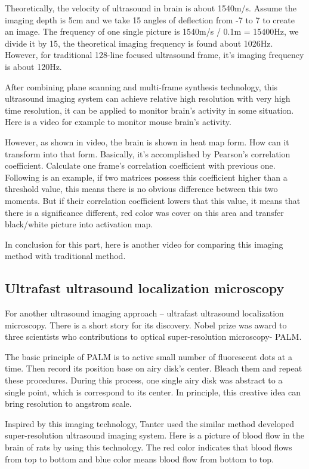\documentclass[paper=a4, fontsize=11pt]{scrartcl} %
\numberwithin{equation}{section} %
\numberwithin{figure}{section} %
\numberwithin{table}{section} %
\begin{document}
Theoretically, the velocity of ultrasound in brain is about 1540m/s. Assume the imaging depth is 5cm and we take 15 angles of deflection from -7 to 7 to create an image. The frequency of one single picture is 1540m/s / 0.1m = 15400Hz, we divide it by 15, the theoretical imaging frequency is found about 1026Hz. However, for traditional 128-line focused ultrasound frame, it’s imaging frequency is about 120Hz.

After combining plane scanning and multi-frame synthesis technology, this ultrasound imaging system can achieve relative high resolution with very high time resolution, it can be applied to monitor brain’s activity in some situation. Here is a video for example to monitor mouse brain’s activity.

However, as shown in video, the brain is shown in heat map form. How can it transform into that form. Basically, it’s accomplished by Pearson’s correlation coefficient. Calculate one frame’s correlation coefficient with previous one. Following is an example, if two matrices possess this coefficient higher than a threshold value, this means there is no obvious difference between this two moments. But if their correlation coefficient lowers that this value, it means that there is a significance different, red color was cover on this area and transfer black/white picture into activation map.

In conclusion for this part, here is another video for comparing this imaging method with traditional method.

\subsection{Ultrafast ultrasound localization microscopy}
For another ultrasound imaging approach – ultrafast ultrasound localization microscopy. There is a short story for its discovery. Nobel prize was award to three scientists who contributions to optical super-resolution microscopy- PALM. 

The basic principle of PALM is to active small number of fluorescent dots at a time. Then record its position base on airy disk’s center. Bleach them and repeat these procedures. During this process, one single airy disk was abstract to a single point, which is correspond to its center. In principle, this creative idea can bring resolution to angstrom scale.

Inspired by this imaging technology, Tanter used the similar method developed super-resolution ultrasound imaging system. Here is a picture of blood flow in the brain of rats by using this technology. The red color indicates that blood flows from top to bottom and blue color means blood flow from bottom to top.
\end{document}
